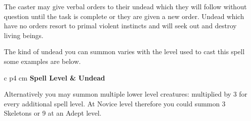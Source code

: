 \documentclass[a5paper,twocolumn, 10pt]{article}
\begin{document}
{{The caster may give verbal orders to their undead\comma{} which they will follow without question until the task is complete\comma{} or they are given a new order. Undead which have no orders resort to primal\comma{} violent instincts and will seek out and destroy living beings. 

The kind of undead you can summon varies with the level used to cast this spell\comma{} some examples are below.

\begin{rndtable}{c p{4 cm}}
\bf Spell Level & \bf Undead \\
\end{rndtable}

Alternatively\comma{} you may summon multiple lower level creatures: multiplied by 3 for every additional spell level. At Novice level therefore\comma{} you could summon 3 Skeletons\comma{} or 9 at an Adept level.
}
}
\end{document}
